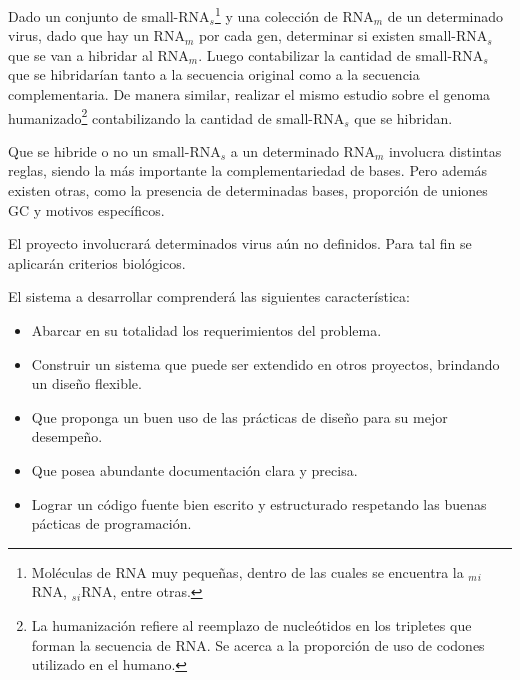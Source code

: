 \documentclass[12pt,a4paper,spanish]{article}
\begin{document}
\par Dado un conjunto de small-RNA$_s$\footnote{Moléculas de RNA muy pequeñas, dentro de las cuales se encuentra la $_m$$_i$RNA, $_s$$_i$RNA, entre otras.} y una colección de RNA$_m$ de un determinado virus, dado que hay un RNA$_m$ por cada gen, determinar si existen small-RNA$_s$ que se van a hibridar al RNA$_m$. Luego contabilizar la cantidad de small-RNA$_s$ que se hibridarían tanto a la secuencia original como a la secuencia complementaria. De manera similar, realizar el mismo estudio sobre el genoma humanizado\footnote{La humanización refiere al reemplazo de nucleótidos en los tripletes que forman la secuencia de RNA. Se acerca a la proporción de uso de codones utilizado en el humano.} contabilizando la cantidad de small-RNA$_s$ que se hibridan. 
\par Que se hibride o no un small-RNA$_s$ a un determinado RNA$_m$ involucra distintas reglas, siendo la más importante la complementariedad de bases. Pero además existen otras, como la presencia de determinadas bases, proporción de uniones GC y motivos específicos.

\par El proyecto involucrará determinados virus aún no definidos. Para tal fin se aplicarán criterios biológicos.

\par El sistema a desarrollar comprenderá las siguientes característica:
\begin{itemize}
	\item Abarcar en su totalidad los requerimientos del problema.
	\item Construir un sistema que puede ser extendido en otros proyectos, brindando un diseño flexible. 
	\item Que proponga un buen uso de las prácticas de diseño para su mejor desempeño.
	\item Que posea abundante documentación clara y precisa.
	\item Lograr un código fuente bien escrito y estructurado respetando las buenas pácticas de programación.
\end{itemize}
\end{document}
